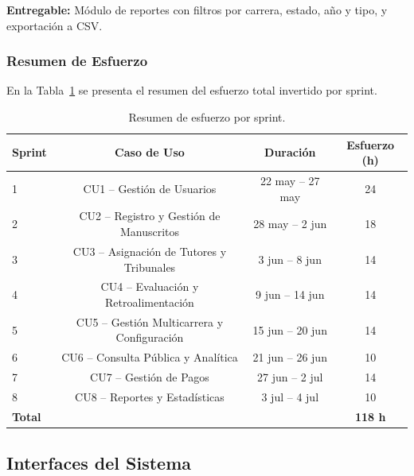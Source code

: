 \textbf{Entregable:} Módulo de reportes con filtros por carrera, estado, año y tipo, y exportación a CSV.

\subsubsection{Resumen de Esfuerzo}

En la Tabla~\ref{tab:resumen-esfuerzo} se presenta el resumen del esfuerzo total invertido por sprint.

\medskip
\noindent
\begin{table}[H]
\centering
\caption{Resumen de esfuerzo por sprint.}
\label{tab:resumen-esfuerzo}
\begin{tabular}{lccc}
\toprule
\textbf{Sprint} & \textbf{Caso de Uso} & \textbf{Duración} & \textbf{Esfuerzo (h)} \\
\midrule
1 & CU1 -- Gestión de Usuarios & 22 may -- 27 may & 24 \\
2 & CU2 -- Registro y Gestión de Manuscritos & 28 may -- 2 jun & 18 \\
3 & CU3 -- Asignación de Tutores y Tribunales & 3 jun -- 8 jun & 14 \\
4 & CU4 -- Evaluación y Retroalimentación & 9 jun -- 14 jun & 14 \\
5 & CU5 -- Gestión Multicarrera y Configuración & 15 jun -- 20 jun & 14 \\
6 & CU6 -- Consulta Pública y Analítica & 21 jun -- 26 jun & 10 \\
7 & CU7 -- Gestión de Pagos & 27 jun -- 2 jul & 14 \\
8 & CU8 -- Reportes y Estadísticas & 3 jul -- 4 jul & 10 \\
\midrule
\multicolumn{3}{l}{\textbf{Total}} & \textbf{118 h} \\
\bottomrule
\end{tabular}
\end{table}
\medskip

\subsection{Interfaces del Sistema}


\endinput
